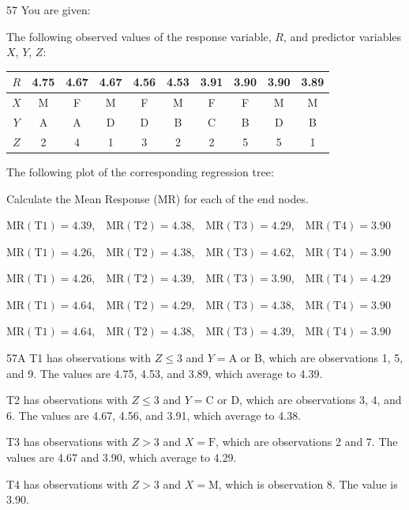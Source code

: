 \begin{question}{57}
You are given:
\begin{given}
\item The following observed values of the response variable, $R$, and predictor variables $X$, $Y$, $Z$:
\begin{center}
\begin{tabular}{|c|c|c|c|c|c|c|c|c|c|}
\hline
$R$ & 4.75 & 4.67 & 4.67 & 4.56 & 4.53 & 3.91 & 3.90 & 3.90 & 3.89 \\ \hline
$X$ & M & F & M & F & M & F & F & M & M \\ \hline
$Y$ & A & A & D & D & B & C & B & D & B \\ \hline
$Z$ & 2 & 4 & 1 & 3 & 2 & 2 & 5 & 5 & 1 \\ \hline
\end{tabular}
\end{center}
\item The following plot of the corresponding regression tree:
\end{given}

Calculate the Mean Response (MR) for each of the end nodes.

\begin{choices}
\item $\mathrm{MR}(\mathrm{T1}) = 4.39$,\ \ $\mathrm{MR}(\mathrm{T2}) = 4.38$,\ \ $\mathrm{MR}(\mathrm{T3}) = 4.29$,\ \ $\mathrm{MR}(\mathrm{T4}) = 3.90$
\item $\mathrm{MR}(\mathrm{T1}) = 4.26$,\ \ $\mathrm{MR}(\mathrm{T2}) = 4.38$,\ \ $\mathrm{MR}(\mathrm{T3}) = 4.62$,\ \ $\mathrm{MR}(\mathrm{T4}) = 3.90$
\item $\mathrm{MR}(\mathrm{T1}) = 4.26$,\ \ $\mathrm{MR}(\mathrm{T2}) = 4.39$,\ \ $\mathrm{MR}(\mathrm{T3}) = 3.90$,\ \ $\mathrm{MR}(\mathrm{T4}) = 4.29$
\item $\mathrm{MR}(\mathrm{T1}) = 4.64$,\ \ $\mathrm{MR}(\mathrm{T2}) = 4.29$,\ \ $\mathrm{MR}(\mathrm{T3}) = 4.38$,\ \ $\mathrm{MR}(\mathrm{T4}) = 3.90$
\item $\mathrm{MR}(\mathrm{T1}) = 4.64$,\ \ $\mathrm{MR}(\mathrm{T2}) = 4.38$,\ \ $\mathrm{MR}(\mathrm{T3}) = 4.39$,\ \ $\mathrm{MR}(\mathrm{T4}) = 3.90$
\end{choices}
\end{question}
\begin{solution}{57}{A}
T1 has observations with $Z \leqslant 3$ and $Y = \mathrm{A}$ or $\mathrm{B}$, which are observations 1, 5, and 9. The values are 4.75, 4.53, and 3.89, which average to 4.39.

T2 has observations with $Z \leqslant 3$ and $Y = \mathrm{C}$ or $\mathrm{D}$, which are observations 3, 4, and 6. The values are 4.67, 4.56, and 3.91, which average to 4.38.

T3 has observations with $Z > 3$ and $X = \mathrm{F}$, which are observations 2 and 7. The values are 4.67 and 3.90, which average to 4.29.

T4 has observations with $Z > 3$ and $X = \mathrm{M}$, which is observation 8. The value is 3.90.
\end{solution}

